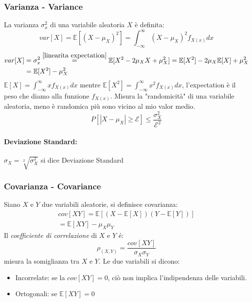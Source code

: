         \subsubsection{Varianza - Variance}
            La varianza $\sigma^2_x$ di una variabile aleatoria $X$ è definita:
            \[
                var[X] = \mathbb{E}[(X-\mu_X)^2] = \int_{-\infty}^{\infty} (X-\mu_X)^2f_{X(x)}dx
            \]  
            \begin{align}
                var[X] &= \sigma^2_x \overset{\ref{linearita expectation}}{=} \mathbb{E}[X^2-2\mu_XX+\mu_X^2] = \mathbb{E}[X^2]-2\mu_X\mathbb{E}[X]+\mu_X^2 \nonumber \\
                           &= \mathbb{E}[X^2]-\mu_X^2 \nonumber 
            \end{align}
            $\mathbb{E}[X] = \int_{-\infty}^{\infty} xf_{X(x)}dx$ mentre $\mathbb{E}[X^2] = \int_{-\infty}^{\infty} x^2f_{X(x)}dx$, l'expectation è il peso che diamo alla funzione $f_{X(x)}$.  
            Misura la "randomicità" di una variabile aleatoria, meno è randomica più sono vicino al mio valor medio.
            \[
                P[|X-\mu_X|\geq \mathcal{E}]\leq \frac{\sigma^2_X}{\mathcal{E}^2}
            \]
            \paragraph{Deviazione Standard:} $\sigma_X = \sqrt[2]{\sigma^2_X}$ si dice Deviazione Standard
        \subsubsection{Covarianza - Covariance}
            Siano $X$ e $Y$ due variabili aleatorie, si definisce covarianza:
            \begin{gather}
                cov[XY] = \mathbb{E}[(X-\mathbb{E}[X])(Y-\mathbb{E}[Y])]\nonumber\\
                = \mathbb{E}[XY]-\mu_X\mu_Y\nonumber
            \end{gather}
            Il \emph{coefficiente di correlazione} di $X$ e $Y$ é:
            \[
                \rho_{(X,Y)} = \frac{cov[XY]}{\sigma_X\sigma_Y}
            \]
            misura la somiglianza tra $X$ e $Y$. Le due variabili si dicono:
            \begin{itemize}
                \item {
                    Incorrelate: se la $cov[XY] =0$, ciò non implica l'indipendenza delle variabili.
                }
                \item {
                    Ortogonali: se $\mathbb{E}[XY] = 0$
                }
            \end{itemize}
